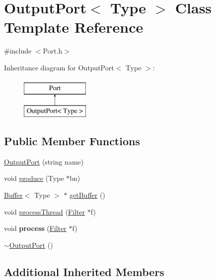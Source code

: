 \hypertarget{classOutputPort}{\section{Output\-Port$<$ Type $>$ Class Template Reference}
\label{classOutputPort}
}


{\ttfamily \#include $<$Port.\-h$>$}

Inheritance diagram for Output\-Port$<$ Type $>$\-:\begin{figure}[H]
\begin{center}
\leavevmode
\includegraphics[height=2.000000cm]{classOutputPort}
\end{center}
\end{figure}
\subsection*{Public Member Functions}
\begin{DoxyCompactItemize}
\item 
\hyperlink{classOutputPort_a98259a5fe42207262746c804152ce711}{Output\-Port} (string name)
\item 
void \hyperlink{classOutputPort_a18fe6d7d5be0a04f23b9048124553fa3}{produce} (Type $\ast$bn)
\item 
\hyperlink{classBuffer}{Buffer}$<$ Type $>$ $\ast$ \hyperlink{classOutputPort_a0bd9c526a6d3848fd5ecdcc4935c3f43}{get\-Buffer} ()
\item 
void \hyperlink{classOutputPort_ab6ef20f12eab6ac3188fff5f9bf34074}{process\-Thread} (\hyperlink{classFilter}{Filter} $\ast$f)
\item 
\hypertarget{classOutputPort_a42af5c7e99f82f595386e2c0d21da5ce}{void {\bfseries process} (\hyperlink{classFilter}{Filter} $\ast$f)}\label{classOutputPort_a42af5c7e99f82f595386e2c0d21da5ce}

\item 
\hyperlink{classOutputPort_ac77e96c8a7b605b011043efdc5a905df}{$\sim$\-Output\-Port} ()
\end{DoxyCompactItemize}
\subsection*{Additional Inherited Members}


